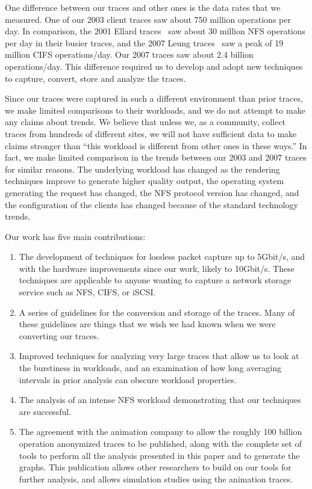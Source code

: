 One difference between our traces and other ones is the data rates that
we measured.  One of our 2003 client traces saw about 750 million
operations per day.  In comparison, the 2001 Ellard
traces~\cite{EllardFast03} saw about 30 million NFS operations per day
in their busier traces, and the 2007 Leung traces~\cite{LeungUsenix08}
saw a peak of 19 million CIFS operations/day.  Our 2007 traces saw
about 2.4 billion operations/day.  This difference required us to
develop and adopt new techniques to capture, convert, store and
analyze the traces.

Since our traces were captured in such a different environment than
prior traces, we make limited comparisons to their workloads, and we
do not attempt to make any claims about trends.  We believe that
unless we, as a community, collect traces from hundreds of different
sites, we will not have sufficient data to make claims stronger than
``this workload is different from other ones in these ways.''  In
fact, we make limited comparison in the trends between our 2003 and
2007 traces for similar reasons.  The underlying workload has changed
as the rendering techniques improve to generate higher quality output,
the operating system generating the request has changed, the NFS
protocol version has changed, and the configuration of the clients has
changed because of the standard technology trends.


Our work has five main contributions:

\begin{enumerate}
\item The development of techniques for lossless packet capture up to
5Gbit/s, and with the hardware improvements since our work, likely to
10Gbit/s.  These techniques are applicable to anyone wanting to capture
a network storage service such as NFS, CIFS, or iSCSI.

\item A series of guidelines for the conversion and storage of the traces.
Many of these guidelines are things that we wish we had known when we
were converting our traces.

\item Improved techniques for analyzing very large traces that allow
us to look at the burstiness in workloads, and an examination of how
long averaging intervals in prior analysis can obscure workload
properties.

\item The analysis of an intense NFS workload demonstrating that our
techniques are successful.

\item The agreement with the animation company to allow the roughly
100 billion operation anonymized traces to be published, along with
the complete set of tools to perform all the analysis presented in
this paper and to generate the graphs.  This publication allows other
researchers to build on our tools for further analysis, and allows
simulation studies using the animation traces.
\end{enumerate}

